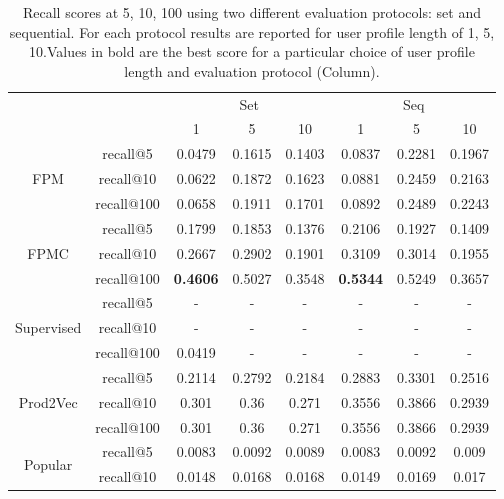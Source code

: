 \documentclass[prodmode,acmtecs]{acmsmall} %
\begin{document}
\begin{table}[htbp]
	\centering
	\caption{Recall scores at 5, 10, 100 using two different evaluation protocols: set and sequential. For each protocol results are reported for user profile length of 1, 5, 10.Values in bold are the best score for a particular choice of user profile length and evaluation protocol (Column).}
	\begin{tabular}{|c|c|c|c|c|c|c|c|}
\cmidrule{3-8}    \multicolumn{1}{c}{} &       & \multicolumn{3}{c|}{Set} & \multicolumn{3}{c|}{Seq} \\
		\cmidrule{3-8}    \multicolumn{1}{c}{} &       & 1     & 5     & 10    & 1     & 5     & 10 \\
		\midrule
		\multirow{3}[6]{*}{FPM} & recall@5 & 0.0479 & 0.1615 & 0.1403 & 0.0837 & 0.2281 & 0.1967 \\
		\cmidrule{2-8}          & recall@10 & 0.0622 & 0.1872 & 0.1623 & 0.0881 & 0.2459 & 0.2163 \\
		\cmidrule{2-8}          & recall@100 & 0.0658 & 0.1911 & 0.1701 & 0.0892 & 0.2489 & 0.2243 \\
		\midrule
		\multirow{3}[6]{*}{FPMC} & recall@5 & 0.1799 & 0.1853 & 0.1376 & 0.2106 & 0.1927 & 0.1409 \\
		\cmidrule{2-8}          & recall@10 & 0.2667 & 0.2902 & 0.1901 & 0.3109 & 0.3014 & 0.1955 \\
		\cmidrule{2-8}          & recall@100 & \textbf{0.4606} & 0.5027 & 0.3548 & \textbf{0.5344} & 0.5249 & 0.3657 \\
		\midrule
		\multirow{3}[6]{*}{Supervised} & recall@5 & -     & -     & -     & -     & -     & - \\
		\cmidrule{2-8}          & recall@10 & -     & -     & -     & -     & -     & - \\
		\cmidrule{2-8}          & recall@100 & 0.0419 & -     & -     & -     & -     & - \\
		\midrule
		\multirow{3}[6]{*}{Prod2Vec} & recall@5 & 0.2114 & 0.2792 & 0.2184 & 0.2883 & 0.3301 & 0.2516 \\
		\cmidrule{2-8}          & recall@10 & 0.301 & 0.36  & 0.271 & 0.3556 & 0.3866 & 0.2939 \\
		\cmidrule{2-8}          & recall@100 & 0.301 & 0.36  & 0.271 & 0.3556 & 0.3866 & 0.2939 \\
		\midrule
		\multirow{3}[6]{*}{Popular} & recall@5 & 0.0083 & 0.0092 & 0.0089 & 0.0083 & 0.0092 & 0.009 \\
		\cmidrule{2-8}          & recall@10 & 0.0148 & 0.0168 & 0.0168 & 0.0149 & 0.0169 & 0.017 \\

\end{tabular}
\end{table}
\end{document}
